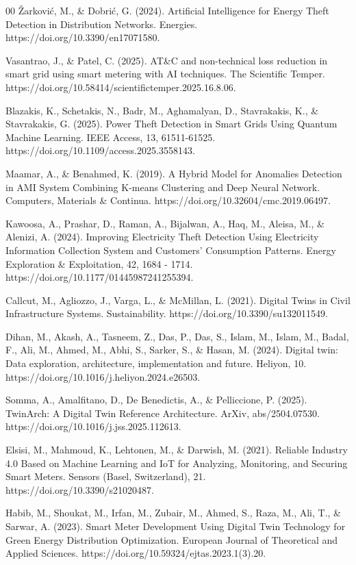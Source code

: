 \documentclass{ieeeaccess}
\begin{document}
\begin{thebibliography}{00}
 Žarković, M., \& Dobrić, G. (2024). Artificial Intelligence for Energy Theft Detection in Distribution Networks. Energies. https://doi.org/10.3390/en17071580.

 Vasantrao, J., \& Patel, C. (2025). AT\&C and non-technical loss reduction in smart grid using smart metering with AI techniques. The Scientific Temper. https://doi.org/10.58414/scientifictemper.2025.16.8.06.

 Blazakis, K., Schetakis, N., Badr, M., Aghamalyan, D., Stavrakakis, K., \& Stavrakakis, G. (2025). Power Theft Detection in Smart Grids Using Quantum Machine Learning. IEEE Access, 13, 61511-61525. https://doi.org/10.1109/access.2025.3558143.

 Maamar, A., \& Benahmed, K. (2019). A Hybrid Model for Anomalies Detection in AMI System Combining K-means Clustering and Deep Neural Network. Computers, Materials \& Continua. https://doi.org/10.32604/cmc.2019.06497.

 Kawoosa, A., Prashar, D., Raman, A., Bijalwan, A., Haq, M., Aleisa, M., \& Alenizi, A. (2024). Improving Electricity Theft Detection Using Electricity Information Collection System and Customers’ Consumption Patterns. Energy Exploration \& Exploitation, 42, 1684 - 1714. https://doi.org/10.1177/01445987241255394.

 Callcut, M., Agliozzo, J., Varga, L., \& McMillan, L. (2021). Digital Twins in Civil Infrastructure Systems. Sustainability. https://doi.org/10.3390/su132011549.

 Dihan, M., Akash, A., Tasneem, Z., Das, P., Das, S., Islam, M., Islam, M., Badal, F., Ali, M., Ahmed, M., Abhi, S., Sarker, S., \& Hasan, M. (2024). Digital twin: Data exploration, architecture, implementation and future. Heliyon, 10. https://doi.org/10.1016/j.heliyon.2024.e26503.

 Somma, A., Amalfitano, D., De Benedictis, A., \& Pelliccione, P. (2025). TwinArch: A Digital Twin Reference Architecture. ArXiv, abs/2504.07530. https://doi.org/10.1016/j.jss.2025.112613.

 Elsisi, M., Mahmoud, K., Lehtonen, M., \& Darwish, M. (2021). Reliable Industry 4.0 Based on Machine Learning and IoT for Analyzing, Monitoring, and Securing Smart Meters. Sensors (Basel, Switzerland), 21. https://doi.org/10.3390/s21020487.

 Habib, M., Shoukat, M., Irfan, M., Zubair, M., Ahmed, S., Raza, M., Ali, T., \& Sarwar, A. (2023). Smart Meter Development Using Digital Twin Technology for Green Energy Distribution Optimization. European Journal of Theoretical and Applied Sciences. https://doi.org/10.59324/ejtas.2023.1(3).20.


\end{thebibliography}
\end{document}

